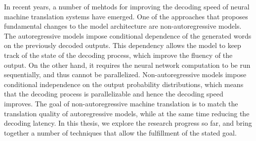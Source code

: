 In recent years, a number of mehtods for improving the decoding speed of neural
machine translation systems have emerged.
%
One of the approaches that proposes fundamental changes to the model
architecture are non-autoregressive models.
%
The autoregressive models impose conditional dependence of the generated words
on the previously decoded outputs.
%
This dependency allows the model to keep track of the state of the decoding
process, which improve the fluency of the output.
%
On the other hand, it requires the neural network computation to be run
sequentially, and thus cannot be parallelized.
%
Non-autoregressive models impose conditional independence on the output
probability distributions, which means that the decoding process is
parallelizable and hence the decoding speed improves.
%
The goal of non-autoregressive machine translation is to match the translation
quality of autoregressive models, while at the same time reducing the decoding
latency.
%
In this thesis, we explore the research progress so far, and bring together
a number of techniques that allow the fulfillment of the stated goal.


